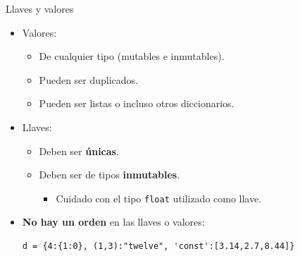 \documentclass[mathserif]{beamer}
\begin{document}
\begin{frame}[fragile]{Llaves y valores}
    \begin{itemize}
        \item Valores: 
            \begin{itemize}
                \item De cualquier tipo ({\blue mutables} e {\blue inmutables}).
                \item Pueden ser {\blue duplicados}.
                \item Pueden ser listas o incluso otros diccionarios.
            \end{itemize}
            
        \item Llaves: 
            \begin{itemize}
                \item Deben ser {\orange\bfseries únicas}.
                \item Deben ser de tipos {\orange\bfseries inmutables}.
                \begin{itemize}
                    \item Cuidado con el tipo \lstinline|float| utilizado como llave.
                \end{itemize}
            \end{itemize}
         
        \item {\blue\bfseries No hay un orden} en las llaves o valores:
\begin{lstlisting}
d = {4:{1:0}, (1,3):"twelve", 'const':[3.14,2.7,8.44]}
\end{lstlisting}
    \end{itemize}
\end{frame}
\end{document}
